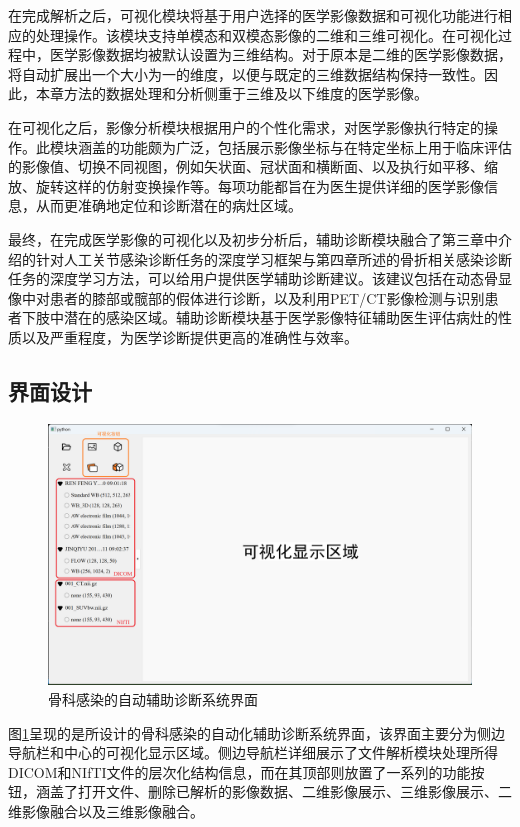 在完成解析之后，可视化模块将基于用户选择的医学影像数据和可视化功能进行相应的处理操作。该模块支持单模态和双模态影像的二维和三维可视化。在可视化过程中，医学影像数据均被默认设置为三维结构。对于原本是二维的医学影像数据，将自动扩展出一个大小为一的维度，以便与既定的三维数据结构保持一致性。因此，本章方法的数据处理和分析侧重于三维及以下维度的医学影像。

在可视化之后，影像分析模块根据用户的个性化需求，对医学影像执行特定的操作。此模块涵盖的功能颇为广泛，包括展示影像坐标与在特定坐标上用于临床评估的影像值、切换不同视图，例如矢状面、冠状面和横断面、以及执行如平移、缩放、旋转这样的仿射变换操作等。每项功能都旨在为医生提供详细的医学影像信息，从而更准确地定位和诊断潜在的病灶区域。

最终，在完成医学影像的可视化以及初步分析后，辅助诊断模块融合了第三章中介绍的针对人工关节感染诊断任务的深度学习框架与第四章所述的骨折相关感染诊断任务的深度学习方法，可以给用户提供医学辅助诊断建议。该建议包括在动态骨显像中对患者的膝部或髋部的假体进行诊断，以及利用PET/CT影像检测与识别患者下肢中潜在的感染区域。辅助诊断模块基于医学影像特征辅助医生评估病灶的性质以及严重程度，为医学诊断提供更高的准确性与效率。

\subsection{界面设计}

\begin{figure}[htbp]
    \centering
    \includegraphics[width=\textwidth]{figures/chap05_preview.png}
    \caption{骨科感染的自动辅助诊断系统界面}
    \label{fig:chap05_preview}
\end{figure}

图\ref{fig:chap05_preview}呈现的是所设计的骨科感染的自动化辅助诊断系统界面，该界面主要分为侧边导航栏和中心的可视化显示区域。侧边导航栏详细展示了文件解析模块处理所得DICOM和NIfTI文件的层次化结构信息，而在其顶部则放置了一系列的功能按钮，涵盖了打开文件、删除已解析的影像数据、二维影像展示、三维影像展示、二维影像融合以及三维影像融合。

